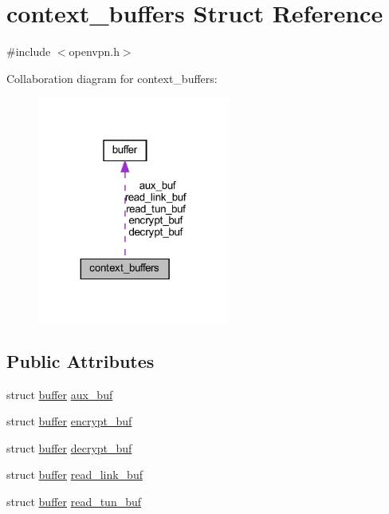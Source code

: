 \hypertarget{structcontext__buffers}{}\section{context\+\_\+buffers Struct Reference}
\label{structcontext__buffers}


{\ttfamily \#include $<$openvpn.\+h$>$}



Collaboration diagram for context\+\_\+buffers\+:
\nopagebreak
\begin{figure}[H]
\begin{center}
\leavevmode
\includegraphics[width=179pt]{structcontext__buffers__coll__graph}
\end{center}
\end{figure}
\subsection*{Public Attributes}
\begin{DoxyCompactItemize}
\item 
struct \hyperlink{structbuffer}{buffer} \hyperlink{structcontext__buffers_ad3e2e97af748c92d2c3310f4631393ef}{aux\+\_\+buf}
\item 
struct \hyperlink{structbuffer}{buffer} \hyperlink{structcontext__buffers_a7030fd4d5442836a9cd3c2a71a1e84e8}{encrypt\+\_\+buf}
\item 
struct \hyperlink{structbuffer}{buffer} \hyperlink{structcontext__buffers_ac3ecbcb5ab79601f229b6badf7c09efb}{decrypt\+\_\+buf}
\item 
struct \hyperlink{structbuffer}{buffer} \hyperlink{structcontext__buffers_a0434309fa3b81366ba6578ee4fe26923}{read\+\_\+link\+\_\+buf}
\item 
struct \hyperlink{structbuffer}{buffer} \hyperlink{structcontext__buffers_aa03e7433c540b45f5e427527739d888c}{read\+\_\+tun\+\_\+buf}
\end{DoxyCompactItemize}


